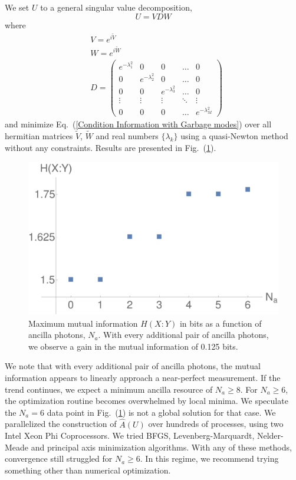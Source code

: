 \documentclass[aps,pra,twocolumn,showpacs,superscriptaddress,floatfix,10pt]{revtex4}
\begin{document}
We set $U$ to a general singular value decomposition,
\begin{equation}
	\label{Singular Value Decomposition}
	U = V D W
\end{equation}
where
\begin{eqnarray}
	& V = e^{i \tilde{V}} \\
	& W = e^{i \tilde{W}} \\
	& D =  \begin{pmatrix} e^{-\lambda^2_1} & 0 & 0 & \hdots & 0 \\ 0 & e^{-\lambda^2_2} & 0 & \hdots & 0 \\ 0 & 0 & e^{-\lambda^2_3} & \hdots & 0 \\ \vdots
	& \vdots & \vdots & \ddots & \vdots \\
	0 & 0 & 0 & \hdots & e^{-\lambda^2_M} \end{pmatrix} 
\end{eqnarray}
and minimize Eq.~(\ref{Condition Information with Garbage modes}) over all hermitian matrices $\tilde{V}$, $\tilde{W}$ and real numbers $\{\lambda_k\}$ using a quasi-Newton method without any constraints. Results are presented in Fig.~(\ref{Mutual Information Results}).
\begin{figure}[ht]
	\centering
	\includegraphics[width= 0.48 \textwidth]{./EntropyData.pdf}
	\caption{ Maximum mutual information $H(X:Y)$ in bits as a function of ancilla photons, $N_a$. With every additional pair of ancilla photons, we observe a gain in the mutual information of 0.125 bits. }
	\label{Mutual Information Results}
\end{figure}
We note that with every additional pair of ancilla photons, the mutual information appears to linearly approach a near-perfect measurement. If the trend continues, we expect a minimum ancilla resource of $N_a \ge 8$. For $N_a \ge 6$, the optimization routine becomes overwhelmed by local minima. We speculate the $N_a=6$ data point in Fig.~(\ref{Mutual Information Results}) is not a global solution for that case. We parallelized the construction of $\hat{A}(U)$ over hundreds of processes, using two Intel Xeon Phi Coprocessors. We tried BFGS, Levenberg-Marquardt, Nelder-Meade and principal axis minimization algorithms. With any of these methods, convergence still struggled for $N_a \ge 6$. In this regime, we recommend trying something other than numerical optimization.
\end{document}

